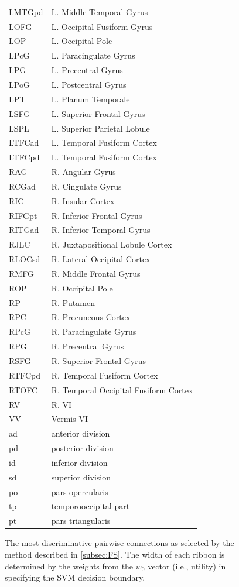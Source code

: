 \documentclass{llncs}
\begin{document}
\begin{figure}[htb]
\begin{minipage}[b]{.4\linewidth}
\begin{tabular}{l l}
LMTGpd	& L. Middle Temporal Gyrus\\
LOFG	& L. Occipital Fusiform Gyrus\\
LOP	& L. Occipital Pole\\
LPcG	& L. Paracingulate Gyrus\\
LPG	& L. Precentral Gyrus\\
LPoG	& L. Postcentral Gyrus\\
LPT	& L. Planum Temporale\\
LSFG	& L. Superior Frontal Gyrus\\
LSPL	& L. Superior Parietal Lobule\\
LTFCad	& L. Temporal Fusiform Cortex\\
LTFCpd	& L. Temporal Fusiform Cortex\\
RAG	& R. Angular Gyrus\\
RCGad	& R. Cingulate Gyrus\\
RIC	& R. Insular Cortex\\
RIFGpt	& R. Inferior Frontal Gyrus\\
RITGad	& R. Inferior Temporal Gyrus\\
RJLC	& R. Juxtapositional Lobule Cortex\\
RLOCsd	& R. Lateral Occipital Cortex\\
RMFG	& R. Middle Frontal Gyrus\\
ROP	& R. Occipital Pole\\
RP	& R. Putamen\\
RPC	& R. Precuneous Cortex\\
RPcG	& R. Paracingulate Gyrus\\
RPG	& R. Precentral Gyrus\\
RSFG	& R. Superior Frontal Gyrus\\
RTFCpd	& R. Temporal Fusiform Cortex\\
RTOFC	& R. Temporal Occipital Fusiform Cortex\\
RV	& R. VI\\
VV	& Vermis VI\\
\hline
ad & anterior division\\
pd & posterior division\\
id & inferior division\\
sd & superior division\\
po & pars opercularis\\
tp & temporooccipital part\\
pt & pars triangularis\\
\hline
\end{tabular}
\par\vspace{0pt}
\end{minipage}
\caption{The most discriminative pairwise connections as selected by the method described in \ref{subsec:FS}.  The width of each ribbon is determined by the weights from the $w_0$ vector (i.e., utility) in  specifying the SVM decision boundary. }
\label{fig:circos}
\end{figure}
\end{document}
